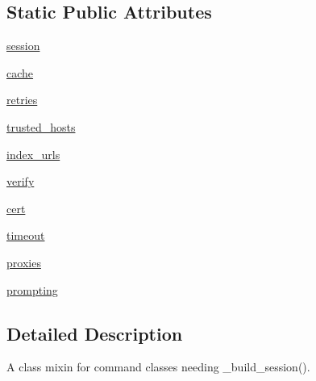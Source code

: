 \subsection*{Static Public Attributes}
\begin{DoxyCompactItemize}
\item 
\hyperlink{classpip_1_1__internal_1_1cli_1_1req__command_1_1SessionCommandMixin_a3eabe7fe9ef6276b53ab5d355ff4b320}{session}
\item 
\hyperlink{classpip_1_1__internal_1_1cli_1_1req__command_1_1SessionCommandMixin_ad26acb03a8096cef993705fb32c69853}{cache}
\item 
\hyperlink{classpip_1_1__internal_1_1cli_1_1req__command_1_1SessionCommandMixin_aa3be0971c2f62d885fbcc026c7eb33eb}{retries}
\item 
\hyperlink{classpip_1_1__internal_1_1cli_1_1req__command_1_1SessionCommandMixin_a34d0b2c770cba9718869eaad32ab5022}{trusted\+\_\+hosts}
\item 
\hyperlink{classpip_1_1__internal_1_1cli_1_1req__command_1_1SessionCommandMixin_aa3365b3bbe17128a9b23fc65fca23126}{index\+\_\+urls}
\item 
\hyperlink{classpip_1_1__internal_1_1cli_1_1req__command_1_1SessionCommandMixin_a77f57eec02c6813ccd5496ae93ea96f9}{verify}
\item 
\hyperlink{classpip_1_1__internal_1_1cli_1_1req__command_1_1SessionCommandMixin_a89923aae852d185fd10e145054654a8e}{cert}
\item 
\hyperlink{classpip_1_1__internal_1_1cli_1_1req__command_1_1SessionCommandMixin_a5d1eaff392d7ad5742201b8bda019332}{timeout}
\item 
\hyperlink{classpip_1_1__internal_1_1cli_1_1req__command_1_1SessionCommandMixin_a20d7ddc38d527dfa7921ee5e3df3c657}{proxies}
\item 
\hyperlink{classpip_1_1__internal_1_1cli_1_1req__command_1_1SessionCommandMixin_aa2eb8955a19164efc2cf497679b9e346}{prompting}
\end{DoxyCompactItemize}


\subsection{Detailed Description}
\begin{DoxyVerb}A class mixin for command classes needing _build_session().
\end{DoxyVerb}
 

